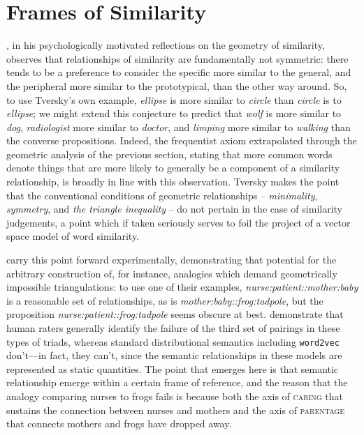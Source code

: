 \section{Frames of Similarity} \label{sec:frames}
\cite{Tversky1977}, in his psychologically motivated reflections on the geometry of similarity, observes that relationships of similarity are fundamentally not symmetric: there tends to be a preference to consider the specific more similar to the general, and the peripheral more similar to the prototypical, than the other way around.  So, to use Tversky's own example, \emph{ellipse} is more similar to \emph{circle} than \emph{circle} is to \emph{ellipse}; we might extend this conjecture to predict that \emph{wolf} is more similar to \emph{dog}, \emph{radiologist} more similar to \emph{doctor}, and \emph{limping} more similar to \emph{walking} than the converse propositions.  Indeed, the frequentist axiom extrapolated through the geometric analysis of the previous section, stating that more common words denote things that are more likely to generally be a component of a similarity relationship, is broadly in line with this observation.  Tversky makes the point that the conventional conditions of geometric relationships -- \emph{minimality}, \emph{symmetry}, and \emph{the triangle inequality} -- do not pertain in the case of similarity judgements, a point which if taken seriously serves to foil the project of a vector space model of word similarity.

\cite{ChenEA2017} carry this point forward experimentally, demonstrating that potential for the arbitrary construction of, for instance, analogies which demand geometrically impossible triangulations: to use one of their examples, \emph{nurse:patient::mother:baby} is a reasonable set of relationships, as is \emph{mother:baby::frog:tadpole}, but the proposition \emph{nurse:patient::frog:tadpole} seems obscure at best.  \citeauthor{ChenEA2017} demonstrate that human raters generally identify the failure of the third set of pairings in these types of triads, whereas standard distributional semantics including \texttt{word2vec} don't---in fact, they can't, since the semantic relationships in these models are represented as static quantities.  The point that emerges here is that semantic relationship emerge within a certain frame of reference, and the reason that the analogy comparing nurses to frogs fails is because both the axis of \textsc{caring} that sustains the connection between nurses and mothers and the axis of \textsc{parentage} that connects mothers and frogs have dropped away.

